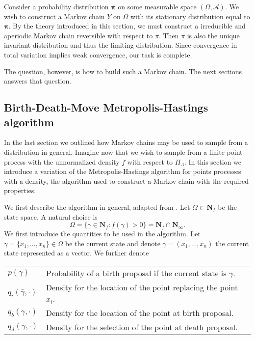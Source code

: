 Consider a probability distribution $\mathbf \pi$ on some measurable space $(\Omega,\mathcal A)$. We wish to construct a Markov chain $Y$ on $\Omega$ with its stationary distribution equal to $\mathbf \pi$. By the theory introduced in this section, we must construct a irreducible and aperiodic Markov chain reversible with respect to $\pi$. Then $\pi$ is also the unique invariant distribution and thus 
the limiting distribution. Since convergence in total variation implies weak convergence, our task is complete.

The question, however, is how to build such a Markov chain. The next sections answers that question. 



\subsection{Birth-Death-Move Metropolis-Hastings algorithm}
In the last section we outlined how Markov chains may be used to sample from a distribution in general. Imagine now that we wish to sample from a finite point process with the unnormalized density $f$ with respect to $\Pi_\Lambda$. In this section we introduce a variation of the Metropolis-Hastings algorithm for points processes with a density, the algorithm used to construct a Markov chain with the required properties. 

We first describe the algorithm in general, adapted from \cite{MollerWaagepetersen2003}.  \newline
\noindent Let $\Omega\subset \mathbf N_f$ be the state space. A natural choice is 
$$\Omega=\{\gamma \in \mathbf N_f: f(\gamma)>0 \} = \mathbf N_f \cap \mathbf N_\infty.$$
We first introduce the quantities to be used in the algorithm. Let $\gamma = \{x_1,\dots, x_n\} \in \Omega$ be the current state and denote $\bar\gamma = (x_1,\dots, x_n)$ the current state represented as a vector. We further denote 

\begin{tabular}{ll}
$p(\gamma)$ & Probability of a birth proposal if the current state is $\gamma$.  \\
$q_i(\bar\gamma,\cdot)$ & Density for the location of the point replacing the point $x_i$. \\
$q_b(\gamma,\cdot)$ & Density for the location of the point at birth proposal. \\
$q_d(\gamma,\cdot)$ & Density for the selection of the point at death proposal. 
\end{tabular}

